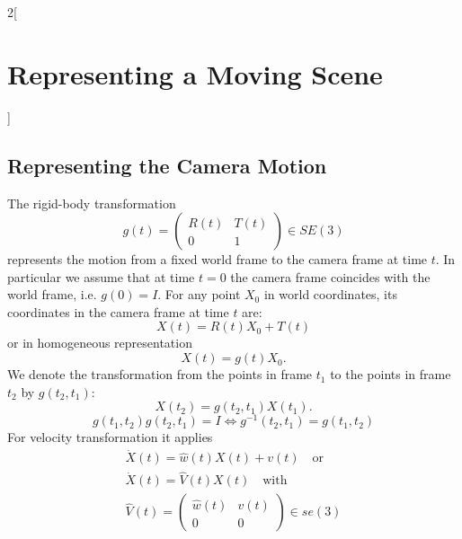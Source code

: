 \documentclass[oneside,fontsize=11pt,paper=a4]{scrartcl}
\begin{document}
\begin{multicols}{2}[\section{Representing a Moving Scene}]
\subsection{Representing the Camera Motion}
The rigid-body transformation
\begin{equation*}
    g(t) = \begin{pmatrix} R(t) & T(t)\\0 & 1 \end{pmatrix} \in SE(3)
\end{equation*}
represents the motion from a fixed world frame to the camera frame at time $t$.
In particular we assume that at time $t = 0$ the camera frame coincides with the world frame, i.e. $g(0) = I$.
For any point $X_0$ in world coordinates, its coordinates in the camera frame at time $t$ are:
\begin{equation*}
    X(t) = R(t)X_0 + T(t)
\end{equation*}
or in homogeneous representation
\begin{equation*}
    X(t) = g(t)X_0.
\end{equation*}
We denote the transformation from the points in frame $t_1$ to the points in frame $t_2$ by $g(t_2,t_1)$:
\begin{equation*}
    X(t_2) = g(t_2, t_1)X(t_1).
\end{equation*}
\begin{equation*}
    g(t_1, t_2)g(t_2, t_1) = I \Leftrightarrow g^{-1}(t_2, t_1) = g(t_1, t_2)
\end{equation*}
For velocity transformation it applies
\begin{equation*}
\begin{split}
        \dot{X}(t) = \hat{w}(t)X(t) + v(t) \quad \text{or} \\ \dot{X}(t) = \hat{V}(t)X(t) \quad \text{with} \\ \hat{V}(t) = \begin{pmatrix}\hat{w}(t) & v(t)\\0 & 0 \end{pmatrix} \in se(3)
\end{split}
\end{equation*}


\end{multicols}
\end{document}
